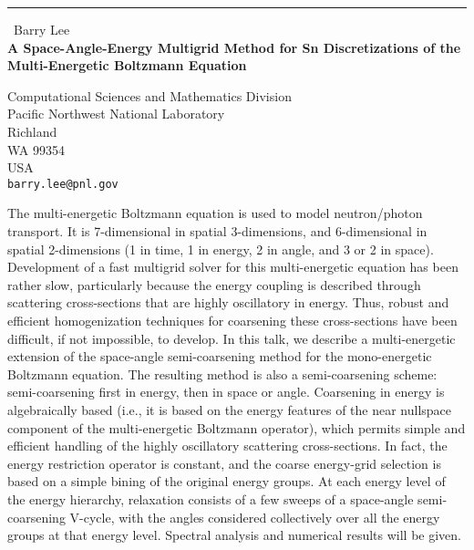 \documentclass{report}
\begin{document}
\begin{center}
\rule{6in}{1pt} \
{\large Barry Lee \\
{\bf A Space-Angle-Energy Multigrid Method for Sn Discretizations of the Multi-Energetic Boltzmann Equation}}

Computational Sciences and Mathematics Division \\ Pacific Northwest National Laboratory \\ Richland \\ WA 99354 \\ USA
\\
{\tt barry.lee@pnl.gov}\end{center}

The multi-energetic Boltzmann equation is used to model neutron/photon
transport. It is 7-dimensional in spatial
3-dimensions, and 6-dimensional in spatial 2-dimensions (1 in time, 1 in
energy, 2 in angle, and 3 or 2 in space).
Development of a fast multigrid solver for this multi-energetic equation
has been rather slow, particularly because
the energy coupling is described through scattering cross-sections that
are highly oscillatory in energy. Thus, robust and
efficient homogenization techniques for coarsening these cross-sections
have been difficult, if not impossible,
to develop. In this talk, we describe a multi-energetic extension of the
space-angle semi-coarsening method for the
mono-energetic Boltzmann equation. The resulting method is also a
semi-coarsening scheme: semi-coarsening
first in energy, then in space or angle. Coarsening in energy is
algebraically based (i.e., it is based on the
energy features of the near nullspace component of the multi-energetic
Boltzmann operator), which permits simple
and efficient handling of the highly oscillatory scattering
cross-sections. In fact, the energy restriction
operator is constant, and the coarse energy-grid selection is based on a
simple bining of the original energy groups.
At each energy level of the energy hierarchy, relaxation
consists of a few sweeps of a space-angle semi-coarsening V-cycle, with
the angles considered collectively over
all the energy groups at that energy level. Spectral analysis and
numerical results will be given.
\end{document}
